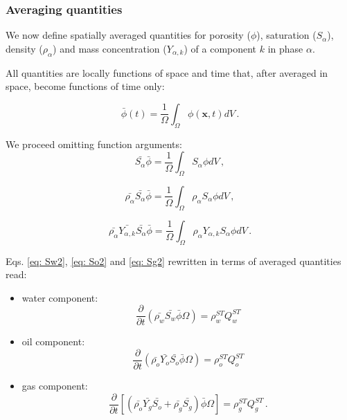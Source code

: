 \documentclass[authoryear,preprint,review,12pt]{elsarticle}
\begin{document}
\subsubsection{Averaging quantities}

We now define spatially averaged quantities for porosity ($\phi$), saturation ($S_\alpha$), density ($\rho_\alpha$) and mass concentration ($Y_{\alpha,k}$) of a component $k$ in phase $\alpha$.

All quantities are locally functions of space and time that, after averaged in space, become functions of time only:

\begin{equation}
\bar{\phi} (t) = \frac{1}{\Omega}\int_{\Omega}\phi \left(\mathbf{x},t\right) dV \, .
\end{equation}

We proceed omitting function arguments:
\begin{equation}
\bar{S_\alpha}\bar{\phi} = \frac{1}{\Omega}\int_{\Omega}S_\alpha \phi dV \, ,
\end{equation}

\begin{equation}
\bar{\rho_\alpha}\bar{S_\alpha}\bar{\phi} = \frac{1}{\Omega}\int_{\Omega}\rho_\alpha S_\alpha \phi dV \, ,
\end{equation}

\begin{equation}
\bar{\rho_\alpha}\bar{Y_{\alpha,k}}\bar{S_\alpha}\bar{\phi} = \frac{1}{\Omega}\int_{\Omega}\rho_\alpha Y_{\alpha,k} S_\alpha \phi dV \, .
\end{equation}

Eqs. \eqref{eq: Sw2}, \eqref{eq: So2} and \eqref{eq: Sg2} rewritten in terms of averaged quantities read:

\begin{itemize}
\item water component:
\begin{equation}\label{eq: Sw3}
\frac{\partial}{\partial t} \left( \bar{\rho_w}\bar{S_w}\bar{\phi} \Omega \right) = \rho_w^{ST}Q_w^{ST}
\end{equation}

\item oil component:
\begin{equation}\label{eq: So3}
\frac{\partial}{\partial t} \left( \bar{\rho_o}\bar{Y_o}\bar{S_o}\bar{\phi} \Omega \right) = \rho_o^{ST}Q_o^{ST}
\end{equation}

\item gas component:
\begin{equation}\label{eq: Sg3}
\frac{\partial}{\partial t} \left[\left( \bar{\rho_o}\bar{Y_g} \bar{S_o} + \bar{\rho_g} \bar{S_g} \right) \bar{\phi} \Omega\right] = \rho_g^{ST}Q_g^{ST} \, .
\end{equation}
\end{itemize}
\end{document}
